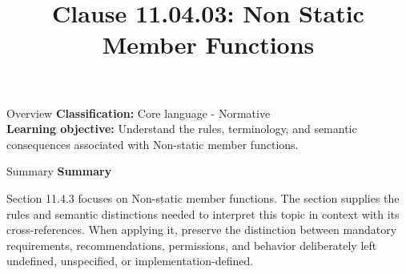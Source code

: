 \documentclass[10pt,letterpaper]{article}
\title{Clause 11.04.03: Non Static Member Functions}
\author{}
\date{}
\begin{document}
\maketitle
\begin{CornellOverviewBox}{Overview}
\textbf{Classification:} Core language - Normative\\[2pt]
\textbf{Learning objective:} Understand the rules, terminology, and semantic consequences associated with Non-static member functions.
\end{CornellOverviewBox}\begin{CornellSummaryBox}{Summary}
{\sffamily\bfseries\color{Accent} Summary}\par\vspace{3pt}Section 11.4.3 focuses on Non-static member functions. The section supplies the rules and semantic distinctions needed to interpret this topic in context with its cross-references. When applying it, preserve the distinction between mandatory requirements, recommendations, permissions, and behavior deliberately left undefined, unspecified, or implementation-defined.
\end{CornellSummaryBox}
\end{document}
